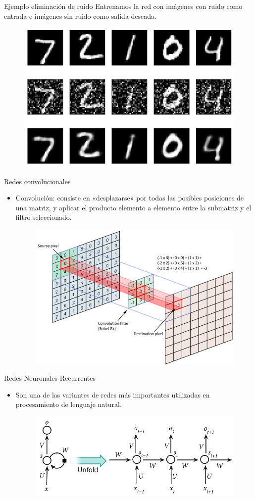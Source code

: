 \documentclass[spanish]{beamer}
\begin{document}
\begin{frame}{Ejemplo eliminación de ruido}
Entrenamos la red con imágenes con ruido como entrada e imágenes sin ruido como
salida deseada.
\begin{figure}[h]
  \includegraphics[width=.6\textwidth]{img/autoencoder_ex2}
\end{figure}
\end{frame}

\begin{frame}{Redes convolucionales}
  \begin{itemize}
    \item Convolución: consiste en «desplazarse» por todas las posibles posiciones de una matriz, y aplicar el producto elemento a elemento entre la submatriz y el filtro seleccionado.

    \begin{figure}[h]
      \centering
      \includegraphics[width=.6\textwidth]{img/conv}
    \end{figure}
  \end{itemize}
\end{frame}



\begin{frame}{Redes Neuronales Recurrentes}
\begin{itemize}
\item Son una de las variantes de redes más importantes utilizadas en procesamiento
de lenguaje natural.
\begin{figure}[h]
  \centering
  \includegraphics[width=.6\textwidth]{img/rnn}
\end{figure}
\end{itemize}
\end{frame}
\end{document}
